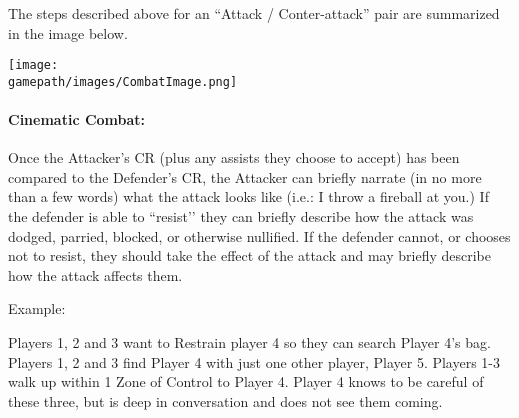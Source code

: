 \documentclass[sheet]{GL2020}
\begin{document}
The steps described above for an ``Attack / Conter-attack” pair are summarized in the image below.
\begin{center}
\texttt{[image: \\gamepath/images/CombatImage.png]}
\end{center}

\paragraph{Cinematic Combat:} Once the Attacker's CR (plus any assists they choose to accept) has been compared to the Defender's CR, the Attacker can briefly narrate (in no more than a few words) what the attack looks like (i.e.: I throw a fireball at you.) If the defender is able to ``resist'’ they can briefly describe how the attack was dodged, parried, blocked, or otherwise nullified. If the defender cannot, or chooses not to resist, they should take the effect of the attack and may briefly describe how the attack affects them.

Example:

Players 1, 2 and 3 want to Restrain player 4 so they can search Player 4’s bag. Players 1, 2 and 3 find Player 4 with just one other player, Player 5. Players 1-3 walk up within 1 Zone of Control to Player 4. Player 4 knows to be careful of these three, but is deep in conversation and does not see them coming.
\end{document}
